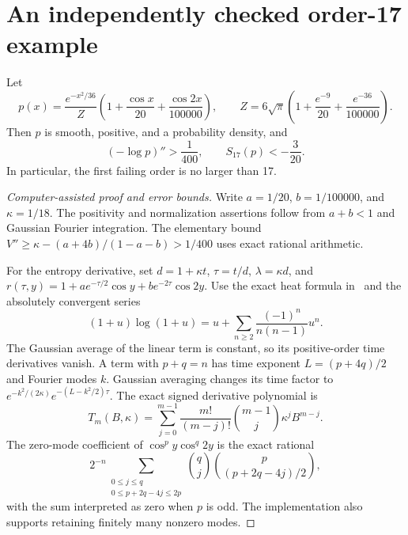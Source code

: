 \section{An independently checked order-17 example}
\begin{proposition}
Let
\[
 p(x)=\frac{e^{-x^2/36}}{Z}
 \left(1+\frac{\cos x}{20}+\frac{\cos2x}{100000}\right),\qquad
 Z=6\sqrt{\pi}\left(1+\frac{e^{-9}}{20}+\frac{e^{-36}}{100000}\right).
\]
Then $p$ is smooth, positive, and a probability density, and
\[
 (-\log p)''>\frac1{400},\qquad S_{17}(p)<-\frac3{20}.
\]
In particular, the first failing order is no larger than 17.
\end{proposition}
\begin{proof}[Computer-assisted proof and error bounds]
Write $a=1/20$, $b=1/100000$, and $\kappa=1/18$.
The positivity and normalization assertions follow from $a+b<1$ and
Gaussian Fourier integration. The elementary bound
$V''\ge\kappa-(a+4b)/(1-a-b)>1/400$ uses exact rational arithmetic.

For the entropy derivative, set $d=1+\kappa t$, $\tau=t/d$,
$\lambda=\kappa d$, and $r(\tau,y)=1+ae^{-\tau/2}\cos y+be^{-2\tau}\cos2y$.
Use the exact heat formula in~\cite{zou} and the absolutely convergent series
\[
 (1+u)\log(1+u)=u+\sum_{n\ge2}\frac{(-1)^n}{n(n-1)}u^n.
\]
The Gaussian average of the linear term is constant, so its positive-order time derivatives vanish. A term with $p+q=n$ has time exponent $L=(p+4q)/2$ and Fourier modes $k$.
Gaussian averaging changes its time factor to
$e^{-k^2/(2\kappa)}e^{-(L-k^2/2)\tau}$.
The exact signed derivative polynomial is
\[
 T_m(B,\kappa)=\sum_{j=0}^{m-1}\frac{m!}{(m-j)!}\binom{m-1}{j}
 \kappa^j B^{m-j}.
\]
The zero-mode coefficient of $\cos^p y\cos^q2y$ is the exact rational
\[
 2^{-n}\sum_{\substack{0\le j\le q\\0\le p+2q-4j\le2p}}
 \binom qj\binom p{(p+2q-4j)/2},
\]
with the sum interpreted as zero when $p$ is odd. The implementation also
supports retaining finitely many nonzero modes.


\end{proof}
